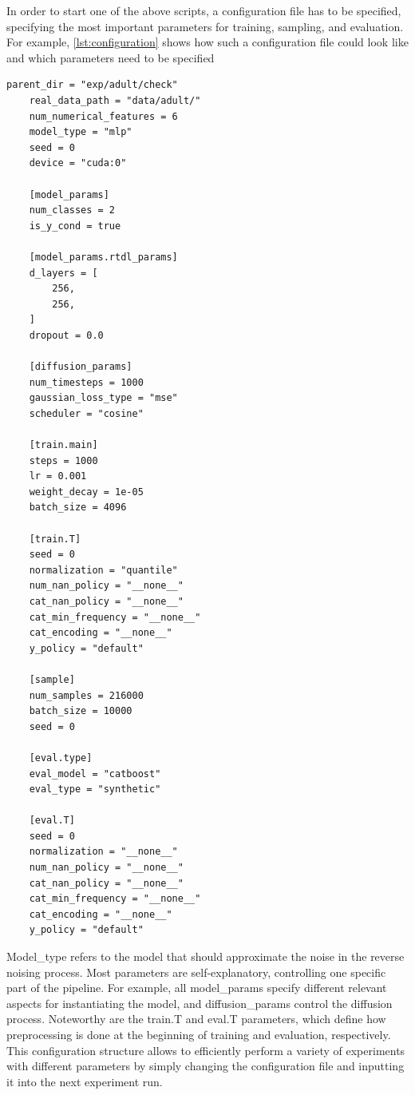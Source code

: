 In order to start one of the above scripts, a configuration file has to be specified, specifying the most important parameters for training, sampling, and evaluation.
For example, \autoref{lst:configuration} shows how such a configuration file could look like and which parameters need to be specified

\begin{lstlisting}[label={lst:configuration}, caption={Example configuration file}]
    parent_dir = "exp/adult/check"
    real_data_path = "data/adult/"
    num_numerical_features = 6
    model_type = "mlp"
    seed = 0
    device = "cuda:0"

    [model_params]
    num_classes = 2
    is_y_cond = true

    [model_params.rtdl_params]
    d_layers = [
        256,
        256,
    ]
    dropout = 0.0

    [diffusion_params]
    num_timesteps = 1000
    gaussian_loss_type = "mse"
    scheduler = "cosine"

    [train.main]
    steps = 1000
    lr = 0.001
    weight_decay = 1e-05
    batch_size = 4096

    [train.T]
    seed = 0
    normalization = "quantile"
    num_nan_policy = "__none__"
    cat_nan_policy = "__none__"
    cat_min_frequency = "__none__"
    cat_encoding = "__none__"
    y_policy = "default"

    [sample]
    num_samples = 216000
    batch_size = 10000
    seed = 0

    [eval.type]
    eval_model = "catboost"
    eval_type = "synthetic"

    [eval.T]
    seed = 0
    normalization = "__none__"
    num_nan_policy = "__none__"
    cat_nan_policy = "__none__"
    cat_min_frequency = "__none__"
    cat_encoding = "__none__"
    y_policy = "default"
\end{lstlisting}    


Model\_type refers to the model that should approximate the noise in the reverse noising process.
Most parameters are self-explanatory, controlling one specific part of the pipeline.
For example, all model\_params specify different relevant aspects for instantiating the model, and diffusion\_params control the diffusion process.
Noteworthy are the train.T and eval.T parameters, which define how preprocessing is done at the beginning of training and evaluation, respectively.
This configuration structure allows to efficiently perform a variety of experiments with different parameters by simply changing the configuration file and inputting it into the next experiment run.

